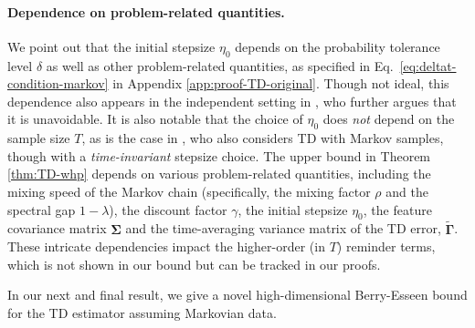 \paragraph{Dependence on problem-related quantities.}
We point out that the initial stepsize $\eta_0$ depends on the probability tolerance level $\delta$ as well as other problem-related quantities, as specified in Eq.~\eqref{eq:deltat-condition-markov} in Appendix \ref{app:proof-TD-original}. Though not ideal, this dependence  %
also appears in the independent setting in \cite[Theorem 3.1]{wu2024statistical}, who further argues that it is unavoidable. It is also notable that the choice of $\eta_0$ does \emph{not} depend on the sample size $T$, as is the case in \cite{samsonov2023finitesample}, who also considers TD with Markov samples, though with a \emph{time-invariant} stepsize choice. 
The upper bound in Theorem \ref{thm:TD-whp} depends on various problem-related quantities, including the mixing speed of the Markov chain (specifically, the mixing factor $\rho$ and the spectral gap $1-\lambda$), the discount factor $\gamma$, the initial stepsize $\eta_0$, the feature covariance matrix $\bm{\Sigma}$ and the time-averaging variance matrix of the TD error, $\tilde{\bm{\Gamma}}$. These intricate dependencies impact the higher-order (in $T$)  reminder terms, which is not shown in our bound but can be tracked in our proofs. %

In our next and final result, we give a novel high-dimensional Berry-Esseen bound for the TD estimator assuming Markovian data. 

